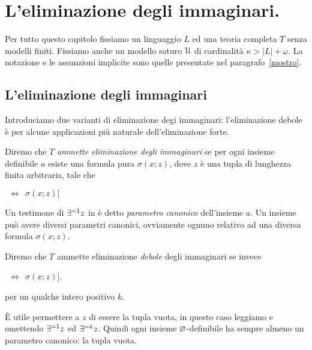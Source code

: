 \chapter{L'eliminazione degli immaginari.}
\label{immaginariB}

\def\ceq#1#2#3{\parbox{30ex}{$\displaystyle #1$}\parbox{4ex}{\hfil$#2$}$\displaystyle #3$}


Per tutto questo capitolo fissiamo un linguaggio $L$ ed una teoria completa $T$ senza modelli finiti. Fissiamo anche un modello saturo $\EuScript U$ di cardinalit\`a $\kappa>|L|+\omega$. La notazione e le assunzioni implicite sono quelle presentate nel paragrafo~\ref{mostro}.

\section{L'eliminazione degli immaginari}


Introduciamo due varianti di eliminazione degi immaginari: l'eliminazione debole \`e per alcune applicazioni pi\`u naturale dell'eliminazione forte. 

\begin{definition}\label{defelimanazioneimmaginari}
Diremo che $T$ \emph{ammette eliminazione degli immaginari\/} se per ogni insieme definibile $a$ esiste una formula pura $\sigma(x;z)$, dove $z$ \`e una tupla di lunghezza finita arbitraria, tale che\smallskip

\noindent{}%
\hspace*{30ex}\llap{$\E^{=1} z\;\A x\ \Big[x\in a$}$\ \  \iff\ \  \sigma(x;z)\Big]$

Un testimone di $\exists^{=1} z$ in  \`e detto \emph{parametro canonico\/} dell'insieme $a$. Un insieme pu\`o avere diversi parametri canonici, ovviamente ognuno relativo ad una diversa formula $\sigma(x;z)$.

Diremo che $T$ ammette eliminazione \emph{debole\/} degli immaginari se invece\smallskip

\noindent{}%
\hspace*{30ex}\llap{$\E^{=k} z\;\A x\ \Big[x\in a$}$\ \  \iff\ \  \sigma(x;z)\Big]$.

per un qualche intero positivo $k$.

\`E utile permettere a $z$ di essere la tupla vuota, in questo caso leggiamo  e  omettendo $\exists^{=1}z$ ed $\exists^{=k}z$. Quindi ogni insieme $\varnothing$-definibile ha sempre almeno un parametro canonico: la tupla vuota.\QED
\end{definition}

